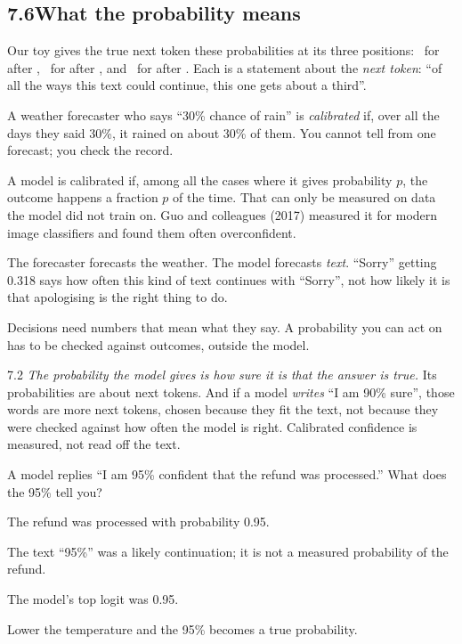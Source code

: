 \subsection*{7.6\quad What the probability means}

Our toy gives the true next token these probabilities at its three positions: \nSevenTrueWaste\ for  after
, \nSevenTrueOf\ for  after , and \nSevenTrueTime\ for  after
. Each is a statement about the \emph{next token}: ``of all the ways this text could continue, this
one gets about a third''.

\Picture A weather forecaster who says ``30\% chance of rain'' is \emph{calibrated} if, over all the days they said
30\%, it rained on about 30\% of them. You cannot tell from one forecast; you check the record.

\Exactly A model is calibrated if, among all the cases where it gives probability $p$, the outcome happens a
fraction $p$ of the time. That can only be measured on data the model did not train on. Guo and colleagues (2017)
measured it for modern image classifiers and found them often overconfident.

\begin{breaks}
The forecaster forecasts the weather. The model forecasts \emph{text}. ``Sorry'' getting 0.318 says how often this
kind of text continues with ``Sorry'', not how likely it is that apologising is the right thing to do.
\end{breaks}

\Why Decisions need numbers that mean what they say. A probability you can act on has to be checked against
outcomes, outside the model.

\begin{wrongidea}{7.2}
\emph{The probability the model gives is how sure it is that the answer is true.} Its probabilities are about next
tokens. And if a model \emph{writes} ``I am 90\% sure'', those words are more next tokens, chosen because they fit the text, not because they were checked against
how often the model is right. Calibrated confidence is measured, not read
off the text.
\end{wrongidea}

\begin{checkq}
A model replies ``I am 95\% confident that the refund was processed.'' What does the 95\% tell you?
\begin{options}
\item The refund was processed with probability 0.95.
\item The text ``95\%'' was a likely continuation; it is not a measured probability of the refund.
\item The model's top logit was 0.95.
\item Lower the temperature and the 95\% becomes a true probability.
\end{options}
\end{checkq}


